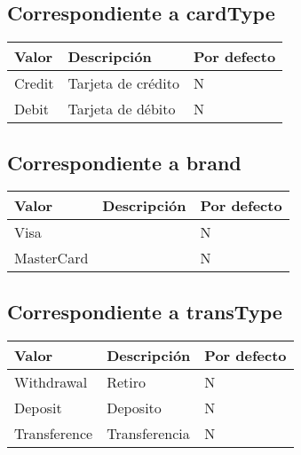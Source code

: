 \subsection{Correspondiente a cardType}
\begin{center}
\begin{tabular}{|>{\centering\arraybackslash}p{}|>{\centering\arraybackslash}p{}|>{\centering\arraybackslash}p{}|}
\hline 
\bfseries {Valor} & \bfseries {Descripción} & \bfseries {Por defecto} \\ 
\hline 
Credit & Tarjeta de crédito & N \\ 
\hline 
Debit & Tarjeta de débito & N \\
\hline 
\end{tabular} 
\end{center}

\subsection{Correspondiente a brand}
\begin{center}
\begin{tabular}{|>{\centering\arraybackslash}p{}|>{\centering\arraybackslash}p{}|>{\centering\arraybackslash}p{}|}
\hline 
\bfseries {Valor} & \bfseries {Descripción} & \bfseries {Por defecto} \\ 
\hline 
Visa &  & N \\ 
\hline 
MasterCard &  & N \\
\hline 
\end{tabular} 
\end{center}

\subsection{Correspondiente a transType}
\begin{center}
\begin{tabular}{|>{\centering\arraybackslash}p{}|>{\centering\arraybackslash}p{}|>{\centering\arraybackslash}p{}|}
\hline 
\bfseries {Valor} & \bfseries {Descripción} & \bfseries {Por defecto} \\ 
\hline 
Withdrawal & Retiro & N \\ 
\hline 
Deposit & Deposito & N \\
\hline 
Transference & Transferencia & N \\
\hline
\end{tabular} 
\end{center}

